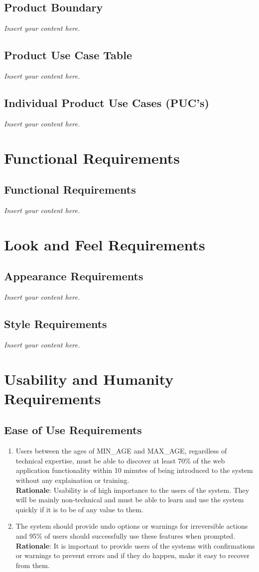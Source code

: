 \documentclass[12pt]{article}
\newcommand{\lips}{\textit{Insert your content here.}}
\begin{document}
\subsection{Product Boundary}
\lips
\subsection{Product Use Case Table}
\lips
\subsection{Individual Product Use Cases (PUC's)}
\lips

\section{Functional Requirements}
\subsection{Functional Requirements}
\lips

\section{Look and Feel Requirements}
\subsection{Appearance Requirements}
\lips
\subsection{Style Requirements}
\lips

\section{Usability and Humanity Requirements}
\subsection{Ease of Use Requirements}
\begin{enumerate}[{UH-EU}1.]
    \item Users between the ages of {MIN\_AGE} and {MAX\_AGE},
      regardless of technical expertise, must be able to discover at least 70\% of
      the web application functionality within 10 minutes of being introduced to
      the system without any explaination or training.\\
      \textbf{Rationale}: Usability is of high importance to the users of the system.
      They will be mainly non-technical and must be able to learn and use the
      system quickly if it is to be of any value to them.
    \item The system should provide undo options or warnings for irreversible actions
      and 95\% of users should successfully use these features when prompted.\\
      \textbf{Rationale}: It is important to provide users of the systems with
      confirmations or warnings to prevent errors and if they do happen, make it
      easy to recover from them.
\end{enumerate}
\end{document}

